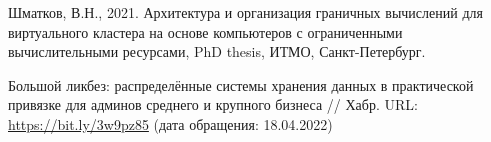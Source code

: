 \begingroup
\renewcommand{\section}[2]{\anonsection{Список использованных источников}}
\begin{thebibliography}{00}
    Шматков, В.Н.,  
    2021. Архитектура и организация граничных вычислений для виртуального кластера на основе компьютеров с ограниченными вычислительными ресурсами, 
    PhD thesis, 
    ИТМО, 
    Санкт-Петербург.

    Большой ликбез: распределённые системы хранения данных в практической 
    привязке для админов среднего и крупного бизнеса // Хабр.
    URL: \href{https://bit.ly/3w9pz85}{https://bit.ly/3w9pz85}
    (дата обращения: 18.04.2022)
    
\end{thebibliography}
\endgroup

\clearpage